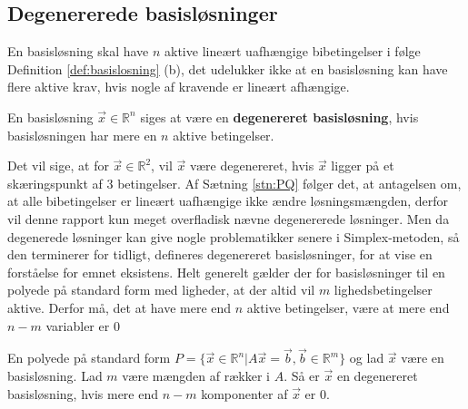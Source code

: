 \subsection{Degenererede basisløsninger}
En basisløsning skal have $n$ aktive lineært uafhængige bibetingelser i følge Definition \ref{def:basislosning} (b), det udelukker ikke at en basisløsning kan have flere aktive krav, hvis nogle af kravende er lineært afhængige. 
\begin{defn}
En basisløsning $\vec{x}\in \mathds{R}^n$ siges at være en \textbf{degenereret basisløsning}, hvis basisløsningen har mere en $n$ aktive betingelser.
\end{defn}
Det vil sige, at for $\vec{x}\in \mathds{R}^2$, vil $\vec{x}$ være degenereret, hvis $\vec{x}$ ligger på et skæringspunkt af $3$ betingelser.
Af Sætning \ref{stn:PQ} følger det, at antagelsen om, at alle bibetingelser er lineært uafhængige ikke ændre løsningsmængden, derfor vil denne rapport kun meget overfladisk nævne degenererede løsninger. 
Men da degenerede løsninger kan give nogle problematikker senere i Simplex-metoden, så den terminerer for tidligt, defineres degenereret basisløsninger, for at vise en forståelse for emnet eksistens.
Helt generelt gælder der for basisløsninger til en polyede på standard form med ligheder, at der altid vil $m$ lighedsbetingelser  aktive. Derfor må, det at have mere end $n$ aktive betingelser, være at mere end $n-m$ variabler er $0$
\begin{defn}
En polyede på standard form $P =\{ \vec{x} \in \mathds{R}^n | A \vec{x} = \vec{b}, \vec{b}\in \mathds{R}^m\}$ og lad $\vec{x}$ være en basisløsning. Lad $m$ være mængden af rækker i $A$. Så er $\vec{x}$ en degenereret basisløsning, hvis mere end $n-m$ komponenter af $\vec{x}$ er $0$.
\end{defn}



